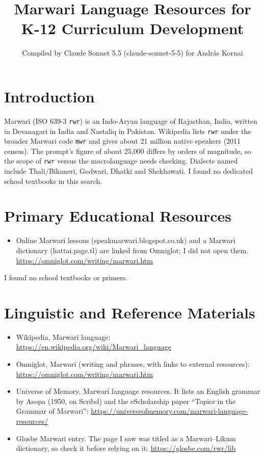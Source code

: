 \documentclass[12pt]{article}
\title{Marwari Language Resources for K-12 Curriculum Development}
\author{Compiled by Claude Sonnet 5.5 (claude-sonnet-5-5) for Andr\'as Kornai}
\date{}
\begin{document}
\maketitle

\section{Introduction}
Marwari (ISO 639-3 \texttt{rwr}) is an Indo-Aryan language of Rajasthan, India, written in Devanagari in India and Nastaliq in Pakistan. Wikipedia lists \texttt{rwr} under the broader Marwari code \texttt{mwr} and gives about 21 million native speakers (2011 census). The prompt's figure of about 25,000 differs by orders of magnitude, so the scope of \texttt{rwr} versus the macrolanguage needs checking. Dialects named include Thali/Bikaneri, Godwari, Dhatki and Shekhawati. I found no dedicated school textbooks in this search.

\section{Primary Educational Resources}
\begin{itemize}
\item Online Marwari lessons (speakmarwari.blogspot.co.uk) and a Marwari dictionary (hattai.page.tl) are linked from Omniglot; I did not open them. \url{https://omniglot.com/writing/marwari.htm}
\end{itemize}
I found no school textbooks or primers.

\section{Linguistic and Reference Materials}
\begin{itemize}
\item Wikipedia, Marwari language: \url{https://en.wikipedia.org/wiki/Marwari_language}
\item Omniglot, Marwari (writing and phrases, with links to external resources): \url{https://omniglot.com/writing/marwari.htm}
\item Universe of Memory, Marwari language resources. It lists an English grammar by Asopa (1950, on Scribd) and the eScholarship paper ``Topics in the Grammar of Marwari'': \url{https://universeofmemory.com/marwari-language-resources/}
\item Glosbe Marwari entry. The page I saw was titled as a Marwari--Likum dictionary, so check it before relying on it: \url{https://glosbe.com/rwr/lib}
\end{itemize}
\end{document}
